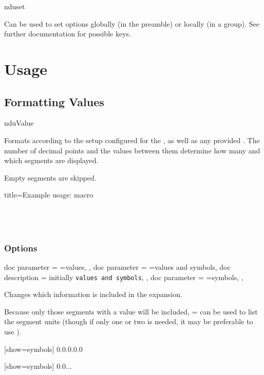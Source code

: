 \documentclass{article}
\begin{document}
\begin{docCommand}
	{nduset}
	{}

	Can be used to set options globally (in the preamble) or locally (in a group). See further documentation for possible keys.

\end{docCommand}

\clearpage
\section{Usage} %

\subsection{Formatting Values} %

\begin{docCommand}
	{nduValue}
	{}

Formats  according to the setup configured for the , as well as any provided . The number of decimal points and the values between them determine how many and which segments are displayed.

Empty segments are skipped.
	
\begin{dispExample*}{
	title=Example usage:  macro
}
\\
\\
\\
\\
\end{dispExample*}
\end{docCommand}

\clearpage
\subsubsection{Options}
	
\begin{docKeys}[
		doc name = show,
	]{
		{
			doc parameter = {=values},
		},
		{
			doc parameter = {=values and symbols},
			doc description = initially \texttt{values and symbols},
		},
		{
			doc parameter = {=symbols},
		},
	}

Changes which information is included in the expansion.

Because only those segments with a value will be included, = can be used to list the segment units (though if only one or two is needed, it may be preferable to use ).

\begin{dispExample}
	[show=symbols]
	{0.0.0.0.0}

	[show=symbols]
	{0.0...}
\end{dispExample}
\end{docKeys}
\end{document}
